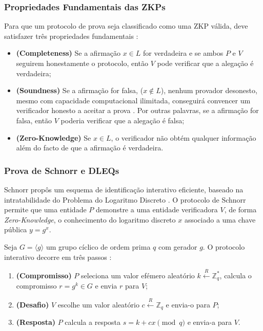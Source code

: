 \subsubsection{Propriedades Fundamentais das ZKPs}

Para que um protocolo de prova seja classificado como uma ZKP válida, deve satisfazer três propriedades fundamentais \cite{mulder2023trends}:

\begin{itemize}
    \item \textbf{(Completeness)} Se a afirmação $x \in L$ for verdadeira e se ambos $P$ e $V$ seguirem honestamente o protocolo, então $V$ pode verificar que a alegação é verdadeira;
    \item \textbf{(Soundness)} Se a afirmação for falsa, ($x \notin L$), nenhum provador desonesto, mesmo com capacidade computacional ilimitada, conseguirá convencer um verificador honesto a aceitar a prova \cite{kurmi2015survey}. Por outras palavras, se a afirmação for falsa, então $V$ poderia verificar que a alegação é falsa;
    \item \textbf{(Zero-Knowledge)} Se $x \in L$, o verificador não obtém qualquer informação além do facto de que a afirmação é verdadeira.
\end{itemize}

\subsubsection{Prova de Schnorr e DLEQs}

Schnorr propôs um esquema de identificação interativo eficiente, baseado na intratabilidade do Problema do Logaritmo Discreto \cite{schnorr1989efficient, schnorr1991efficient}. O protocolo de Schnorr permite que uma entidade $P$ demonstre a uma entidade verificadora $V$, de forma \textit{Zero-Knowledge}, o conhecimento do logaritmo discreto $x$ associado a uma chave pública $y = g^x$.

Seja $G = \langle g \rangle$ um grupo cíclico de ordem prima $q$ com gerador $g$. O protocolo interativo decorre em três passos \cite{paillier2005discretelog}:

\begin{enumerate}
    \item \textbf{(Compromisso)} $P$ seleciona um valor efémero aleatório $k \xleftarrow{R} \mathbb{Z}_q^*$, calcula o compromisso $r = g^k \in G$ e envia $r$ para $V$;
    \item \textbf{(Desafio)} $V$ escolhe um valor aleatório $c \xleftarrow{R} \mathbb{Z}_q$ e envia-o para $P$;
    \item \textbf{(Resposta)} $P$ calcula a resposta $s = k + cx \pmod{q}$ e envia-a para $V$.
\end{enumerate}

